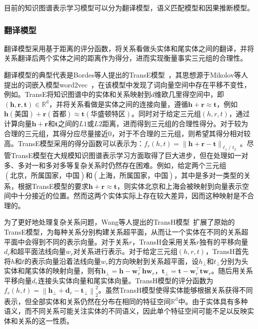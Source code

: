 \documentclass[algorithmlist, AutoFakeBold, AutoFakeSlant, figurelist, tablelist, nomlist, masters]{seuthesix}
\begin{document}
目前的知识图谱表示学习模型可以分为翻译模型，语义匹配模型和因果推断模型。

\subsubsection{翻译模型}
翻译模型采用基于距离的评分函数，将关系看做头实体和尾实体之间的翻译，并将关系翻译后两个实体之间的距离作为得分，进而实现衡量事实三元组的合理性。

翻译模型的典型代表是Bordes等人提出的TransE模型~\cite{bordes2013translating}，其思想源于Mikolov等人提出的词嵌入模型word2vec~\cite{toms2013}，在该模型中发现了词向量空间中存在平移不变性，例如。TransE将知识图谱中的实体和关系映射到$d$维欧几里得空间中，即$\left(\bm{h}, \bm{r}, \bm{t}\right) \in \mathbb{R}^{\mathrm{d}}$，并将关系看做是实体之间的连接向量，遵循$\bm{h} + \bm{r} \approx \bm{t}$，例如$\bm{h}\left(\mbox{美国}\right) + \bm{r}\left(\mbox{首都}\right) \approx \bm{t}\left(\mbox{华盛顿特区}\right)$。同时对于给定三元组$\left(h, r, t\right)$，通过计算向量$\bm{h} + \bm{r}$和$\bm{t}$之间的$L1$或$L2$距离，进而得到三元组的合理性得分。对于较为合理的三元组，其得分应尽量接近0，对于不合理的三元组，则希望其得分相对较高。TransE模型采用的得分函数可以表示为：$f_r(h, t) = \|\bm{h} + \bm{r} - \bm{t}\|_{\ell_1 / \ell_2}$。尽管TransE模型在大规模知识图谱表示学习方面取得了巨大进步，但在处理如一对多、多对一和多对多等复杂关系时仍然存在困难。例如，给定两个三元组$\left(\mbox{北京，所属国家，中国}\right)$和$\left(\mbox{上海，所属国家，中国}\right)$，其中是多对一类型的关系，根据TransE模型的要求$\bm{h} + \bm{r} \approx \bm{t}$，则实体$\mbox{北京}$和$\mbox{上海}$会被映射到向量表示空间中十分接近的位置。然而这两个实体实际上存在较大差异，因而这种映射是不合理的。

为了更好地处理复杂关系问题，Wang等人提出的TransH模型~\cite{wang2014knowledge}扩展了原始的TransE模型，为每种关系分别构建关系超平面，从而让一个实体在不同的关系超平面中会得到不同的表示向量。对于关系$r$，TransH会采用关系$r$独有的平移向量$d_r$和超平面法线向量$w_r$对关系进行表示。对于给定三元组$\left(h, r, t\right)$，TransH首先将$h$和$t$的表示向量沿着法线向量$w_r$的方向映射到关系超平面，设$h_\perp$和$t_\perp$分别为头实体和尾实体的映射向量，则有$\bm{h}_{\perp} = \bm{h} - \bm{w}_r^{\top} \bm{h} \bm{w}_r$，$\bm{t}_{\perp} = \bm{t} - \bm{w}_r^{\top} \bm{t} \bm{w}_r$。随后用关系平移向量$d_r$连接头实体向量和尾实体向量。TransH模型的评分函数为$f_r(h, t) = \left\|\bm{h}_{\perp} + \bm{d}_r - \boldsymbol{t}_{\perp}\right\|_2^2$。虽然TransH模型使得实体能够根据关系获得不同表示，但全部实体和关系仍然在分布在相同的特征空间$\mathbb{R}^{\mathrm{d}}$中。由于实体具有多种语义，而不同关系可能关注实体的不同语义，因此单个特征空间可能不足以反映实体和关系的这一性质。
\end{document}
